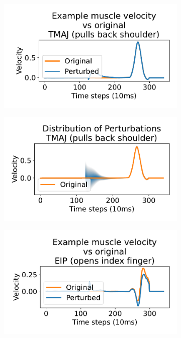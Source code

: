 \documentclass[12pt]{iopart}
\begin{document}
\begin{figure}[h]
	\centering
	\begin{subfigure}[c]{0.48\textwidth}
	    \centering
	    \includegraphics[width=\textwidth]{perturbe_single_tmaj.pdf}
	    \caption{}
	\end{subfigure}
	\hfill
	\begin{subfigure}[c]{0.48\textwidth}
	    \centering
	    \includegraphics[width=\textwidth]{perturbe_dist_tmaj.pdf}
	    \caption{}
	\end{subfigure}
	\hfill
	\begin{subfigure}[c]{0.48\textwidth}
	    \centering
	    \includegraphics[width=\textwidth]{perturbe_single_eip.pdf}

\end{subfigure}
\end{figure}
\end{document}
